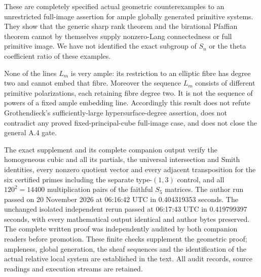 \begin{remark}
\label{rem:root-primitive-permutation-scope}
These are completely specified actual geometric counterexamples
to an unrestricted full-image assertion for ample globally
generated primitive systems. They show that the generic sharp
rank theorem and the birational Pfaffian theorem cannot by
themselves supply nonzero-Lang connectedness or full primitive
image. We have not identified the exact subgroup of \(S_n\)
or the theta coefficient ratio of these examples.

None of the lines \(L_m\) is very ample: its restriction to an
elliptic fibre has degree two and cannot embed that fibre.
Moreover the sequence \(L_m\) consists of different primitive
polarizations, each retaining fibre degree two. It is not the
sequence of powers of a fixed ample embedding line. Accordingly
this result does not refute Grothendieck's sufficiently-large
hypersurface-degree assertion, does not contradict any proved
fixed-principal-cube full-image case, and does not close the
general A.4 gate.

The exact supplement
and its complete companion output
verify the homogeneous cubic and all its partials, the universal
intersection and Smith identities, every nonzero quotient vector
and every adjacent transposition for the six certified primes
including the separate type-\((1,3)\) control, and all
\(120^2=14400\) multiplication pairs of the faithful \(S_5\)
matrices. The author run passed on 20 November 2026 at
06:16:42 UTC in 0.404319353 seconds. The unchanged isolated
independent rerun passed at 06:17:43 UTC in 0.419799397 seconds,
with every mathematical output identical and author bytes
preserved. The complete written proof was independently audited
by both companion readers before promotion. These finite checks
supplement the geometric proof; ampleness, global generation,
the sheaf sequences and the identification of the actual
relative local system are established in the text. All audit
records, source readings and execution streams are retained.
\end{remark}
